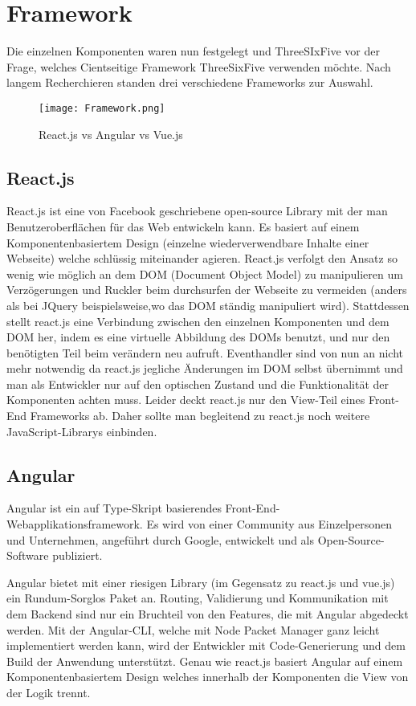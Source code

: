 \section{Framework}
Die einzelnen Komponenten waren nun festgelegt und ThreeSIxFive vor der Frage, welches Cientseitige Framework ThreeSixFive verwenden möchte. Nach langem Recherchieren standen drei verschiedene Frameworks zur Auswahl.
\begin{figure}[H] \centering \texttt{[image: Framework.png]} \caption{React.js vs Angular vs Vue.js} \end{figure}
\subsection{React.js}
React.js\cite{ReactJs} ist eine von Facebook geschriebene open-source Library mit der man Benutzeroberflächen für das Web entwickeln kann. Es basiert auf einem Komponentenbasiertem Design (einzelne wiederverwendbare Inhalte einer Webseite) welche schlüssig miteinander agieren. React.js verfolgt den Ansatz so wenig wie möglich an dem DOM (Document Object Model) zu manipulieren um Verzögerungen und Ruckler beim durchsurfen der Webseite zu vermeiden (anders als bei JQuery beispielsweise,wo das DOM ständig manipuliert wird). Stattdessen stellt react.js eine Verbindung zwischen den einzelnen Komponenten und dem DOM her, indem es eine virtuelle Abbildung des DOMs benutzt, und nur den benötigten Teil beim verändern neu aufruft. Eventhandler sind von nun an nicht mehr notwendig da react.js jegliche Änderungen im DOM selbst übernimmt und man als Entwickler nur auf den optischen Zustand und die Funktionalität der Komponenten achten muss. Leider deckt react.js nur den View-Teil eines Front-End Frameworks ab. Daher sollte man begleitend zu react.js noch weitere JavaScript-Librarys einbinden.
\subsection{Angular}
Angular\cite{Angular} ist ein auf Type-Skript basierendes Front-End-Webapplikationsframework. Es wird von einer Community aus Einzelpersonen und Unternehmen, angeführt durch Google, entwickelt und als Open-Source-Software publiziert.

Angular bietet mit einer riesigen Library (im Gegensatz zu react.js und vue.js) ein Rundum-Sorglos Paket an. Routing, Validierung und Kommunikation mit dem Backend sind nur ein Bruchteil von den Features, die mit Angular abgedeckt werden. Mit der Angular-CLI, welche mit Node Packet Manager ganz leicht implementiert werden kann, wird der Entwickler mit Code-Generierung und dem Build der Anwendung unterstützt. Genau wie react.js basiert Angular auf einem Komponentenbasiertem Design welches innerhalb der Komponenten die View von der Logik trennt.

